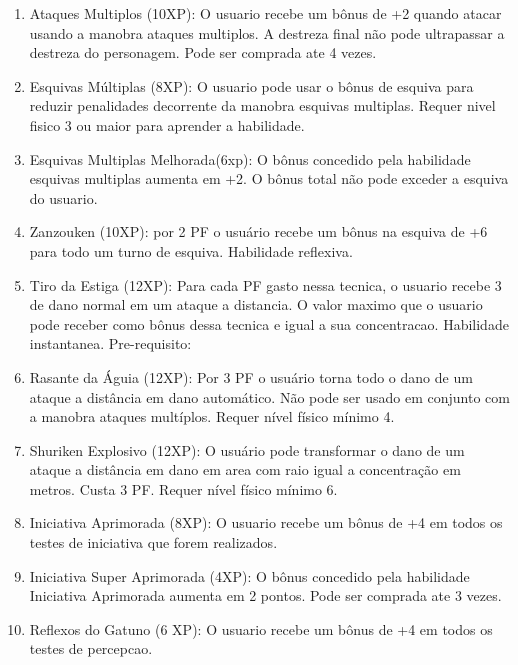 \begin{enumerate}
	\item Ataques Multiplos (10XP): O usuario recebe um bônus de +2 quando atacar usando a manobra ataques multiplos. A destreza final não pode ultrapassar a destreza do personagem. Pode ser comprada ate 4 vezes. 
	
	\item Esquivas Múltiplas (8XP): O usuario pode usar o bônus de esquiva para reduzir penalidades decorrente da manobra esquivas multiplas. Requer nivel fisico 3 ou maior para aprender a habilidade.	

	\item Esquivas Multiplas Melhorada(6xp): O bônus concedido pela habilidade esquivas multiplas aumenta em +2. O bônus total não pode exceder a esquiva do usuario.
	
	\item Zanzouken (10XP): por 2 PF o usuário recebe um bônus na esquiva de +6 para todo um turno de esquiva. Habilidade reflexiva.

	\item Tiro da Estiga (12XP): Para cada PF gasto nessa tecnica, o usuario recebe 3 de dano normal em um ataque a distancia. O valor maximo que o usuario pode receber como bônus dessa tecnica e igual a sua concentracao. Habilidade instantanea. Pre-requisito: 

	\item Rasante da Águia (12XP): Por 3 PF o usuário torna todo o dano de um ataque a distância em dano automático. Não pode ser usado em conjunto com a manobra ataques multíplos. Requer nível físico mínimo 4.
	
	\item Shuriken Explosivo (12XP): O usuário pode transformar o dano de um ataque a distância em dano em area com raio igual a concentração em metros. Custa 3 PF. Requer nível físico mínimo 6.	

	\item Iniciativa Aprimorada (8XP): O usuario recebe um bônus de +4 em todos os testes de iniciativa que forem realizados.

	\item Iniciativa Super Aprimorada (4XP): O bônus concedido pela habilidade Iniciativa Aprimorada aumenta em 2 pontos. Pode ser comprada ate 3 vezes.

	\item Reflexos do Gatuno (6 XP): O usuario recebe um bônus de +4 em todos os testes de percepcao.


\end{enumerate}
